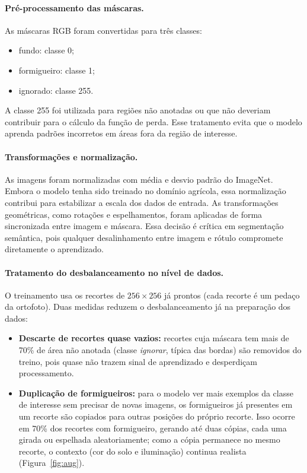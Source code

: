 \documentclass[10pt,a4paper,twocolumn]{article}
\begin{document}
\paragraph{Pré-processamento das máscaras.} As máscaras RGB foram convertidas para três classes:

\begin{itemize}
    \item fundo: classe 0;
    \item formigueiro: classe 1;
    \item ignorado: classe 255.
\end{itemize}

A classe 255 foi utilizada para regiões não anotadas ou que não deveriam contribuir para o cálculo da função de perda. Esse tratamento evita que o modelo aprenda padrões incorretos em áreas fora da região de interesse.

\paragraph{Transformações e normalização.}
As imagens foram normalizadas com média e desvio padrão do ImageNet. Embora o modelo tenha sido treinado no domínio agrícola, essa normalização contribui para estabilizar a escala dos dados de entrada.
As transformações geométricas, como rotações e espelhamentos, foram aplicadas de forma sincronizada entre imagem e máscara. Essa decisão é crítica em segmentação semântica, pois qualquer desalinhamento entre imagem e rótulo compromete diretamente o aprendizado.

\paragraph{Tratamento do desbalanceamento no nível de dados.}
O treinamento usa os recortes de $256\times256$ já prontos (cada recorte é um pedaço da ortofoto). Duas medidas reduzem o desbalanceamento já na preparação dos dados:

\begin{itemize}
    \item \textbf{Descarte de recortes quase vazios:} recortes cuja máscara tem mais de 70\% de área não anotada (classe \textit{ignorar}, típica das bordas) são removidos do treino, pois quase não trazem sinal de aprendizado e desperdiçam processamento.
    \item \textbf{Duplicação de formigueiros:} para o modelo ver mais exemplos da classe de interesse sem precisar de novas imagens, os formigueiros já presentes em um recorte são copiados para outras posições do próprio recorte. Isso ocorre em 70\% dos recortes com formigueiro, gerando até duas cópias, cada uma girada ou espelhada aleatoriamente; como a cópia permanece no mesmo recorte, o contexto (cor do solo e iluminação) continua realista (Figura~\ref{fig:aug}).
\end{itemize}
\end{document}
